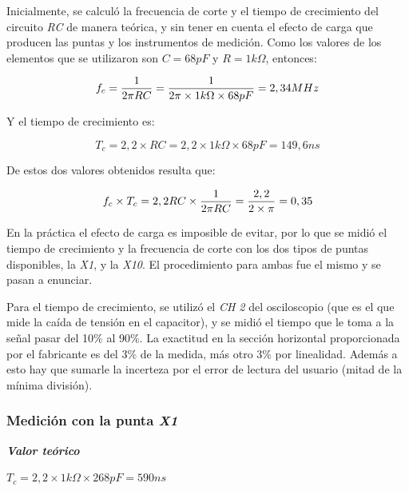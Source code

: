 \documentclass{article}
\begin{document}
	Inicialmente, se calculó la frecuencia de corte y el tiempo de crecimiento del circuito \textit{RC} de manera teórica, y sin tener en cuenta el efecto de carga que producen las puntas y los instrumentos de medición. Como los valores de los elementos que se utilizaron son \textbf{$C = 68pF$} y \textbf{$R = 1k\Omega $}, entonces:
\medskip

\begin{equation*}
	f_c = {1 \over 2 \pi RC} = {1 \over 2 \pi \times 1k\Omega \times 68pF} = 2,34 MHz
\end{equation*}
\medskip

Y el tiempo de crecimiento es:
\medskip

\begin{equation*}
	T_c = 2,2 \times RC = 2,2 \times 1k\Omega \times 68pF = 149,6 ns
\end{equation*}
\medskip

De estos dos valores obtenidos resulta que:
\medskip

\begin{equation*}
	f_c \times T_c = 2,2 RC \times {1 \over 2 \pi RC} = {2,2 \over 2 \times \pi} = 0,35
\end{equation*}
\medskip


	En la práctica el efecto de carga es imposible de evitar, por lo que se midió el tiempo de crecimiento y la frecuencia de corte con los dos tipos de puntas disponibles, la \textit{X1}, y la \textit{X10}. El procedimiento para ambas fue el mismo y se pasan a enunciar.
	\par
	Para el tiempo de crecimiento, se utilizó el \textit{CH 2} del osciloscopio (que es el que mide la caída de tensión en el capacitor), y se midió el tiempo que le toma a la señal pasar del 10\% al 90\%. La exactitud en la sección horizontal proporcionada por el fabricante es del 3\% de la medida, más otro 3\% por linealidad. Además a esto hay que sumarle la incerteza por el error de lectura del usuario (mitad de la mínima división).
\bigskip\medskip



\subsubsection{Medición con la punta \textit{X1}}
\medskip
	
\textbf{\textit{Valor teórico}}
\medskip

$T_c = 2,2 \times 1k\Omega \times 268pF = 590 ns$\\
\end{document}
